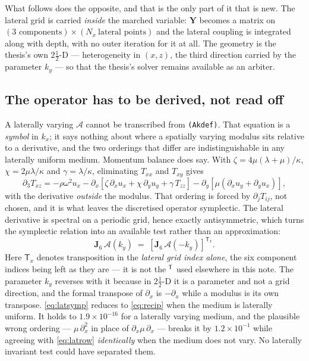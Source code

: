 \documentclass[11pt,a4paper]{article}
\newcommand{\Aop}{\mathcal{A}}
\newcommand{\Jsix}{\mathbf{J}_{6}}
\newcommand{\tp}{^{\mkern-1.5mu\mathsf{T}}}
\newcommand{\bY}{\mathbf{Y}}
\begin{document}
What follows does the opposite, and that is the only part of it that is new.
The lateral grid is carried \emph{inside} the marched variable: $\bY$ becomes a
matrix on $(\text{3 components})\times(N_x\ \text{lateral points})$ and the
lateral coupling is integrated along with depth, with no outer iteration for it
at all.  The geometry is the thesis's own $2\tfrac12$-D --- heterogeneity in
$(x,z)$, the third direction carried by the parameter $k_y$ --- so that the
thesis's solver remains available as an arbiter.

\subsection{The operator has to be derived, not read off}\label{sec:latop}

A laterally varying $\Aop$ cannot be transcribed from \texttt{(Akdef)}.  That
equation is a \emph{symbol} in $k_x$; it says nothing about where a spatially
varying modulus sits relative to a derivative, and the two orderings that
differ are indistinguishable in any laterally uniform medium.  Momentum balance
does say.  With $\zeta = 4\mu(\lambda+\mu)/\kappa$, $\chi = 2\mu\lambda/\kappa$
and $\gamma = \lambda/\kappa$, eliminating $T_{xx}$ and $T_{xy}$ gives
\begin{equation}\label{eq:latrow}
  \partial_3 T_{xz} = -\rho\omega^{2}u_x
    - \partial_x\!\left[\zeta\,\partial_x u_x + \chi\,\partial_y u_y
      + \gamma\,T_{zz}\right]
    - \partial_y\!\left[\mu\left(\partial_x u_y + \partial_y u_x\right)\right],
\end{equation}
with the derivative \emph{outside} the modulus.  That ordering is forced by
$\partial_j T_{ij}$, not chosen, and it is what leaves the discretised operator
symplectic.  The lateral derivative is spectral on a periodic grid, hence
exactly antisymmetric, which turns the symplectic relation into an available
test rather than an approximation:
\begin{equation}\label{eq:latsymp}
  \Jsix\,\Aop(k_y) \;=\; \left[\Jsix\,\Aop(-k_y)\right]^{\mathsf{T}_x} .
\end{equation}
Here $\mathsf{T}_x$ denotes transposition in the \emph{lateral grid index
alone}, the six component indices being left as they are --- it is not the
$\tp$ used elsewhere in this note.  The parameter $k_y$ reverses with it
because in $2\tfrac12$-D it is a parameter and not a grid direction, and the
formal transpose of $\partial_x$ is $-\partial_x$ while a modulus is its own
transpose.  \eqref{eq:latsymp} reduces to \eqref{eq:recip} when the medium is
laterally uniform.  It
holds to $1.9\times10^{-16}$ for a laterally varying medium, and the plausible
wrong ordering --- $\mu\,\partial_x^2$ in place of
$\partial_x\mu\,\partial_x$ --- breaks it by $1.2\times10^{-1}$ while agreeing
with \eqref{eq:latrow} \emph{identically} when the medium does not vary.  No
laterally invariant test could have separated them.
\end{document}
